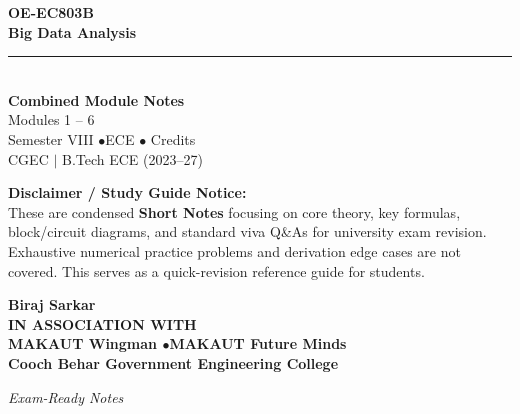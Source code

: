 \documentclass[12pt,a4paper]{article}
\begin{document}
\thispagestyle{empty}


\vspace*{1.0cm}
\begin{center}
  {\Huge\bfseries\color{myred} OE-EC803B}\\[10pt]
  {\LARGE\bfseries\color{mydark} Big Data Analysis}\\[20pt]
  {\color{myred}\rule{0.7\linewidth}{1.5pt}}\\[18pt]
  {\Large\color{myteal}\textbf{Combined Module Notes}}\\[8pt]
  {\large\color{mydark} Modules 1 -- 6}\\[40pt]
  {\normalsize\color{mydark} Semester VIII \quad$\bullet$\quad ECE \quad$\bullet$ Credits}\\[12pt]
  {\normalsize\color{mydark} CGEC \;$|$\; B.Tech ECE (2023--27)}
\end{center}
\vspace{1.0cm}
\begin{center}
  \begin{tcolorbox}[colback=mygray, colframe=mgframe, boxrule=0.5pt, arc=3pt, width=0.85\linewidth]
    \centering\small\color{mydark}
    \textbf{Disclaimer / Study Guide Notice:}\\
    These are condensed \textbf{Short Notes} focusing on core theory, key formulas, block/circuit diagrams, and standard viva Q\&As for university exam revision. Exhaustive numerical practice problems and derivation edge cases are not covered. This serves as a quick-revision reference guide for students.
  \end{tcolorbox}
\end{center}
\vfill
\vspace{0.6cm}
\begin{center}
  {\large\bfseries\color{mypurple} Biraj Sarkar}\\[16pt]
  {\footnotesize\color{watermark}\textbf{IN ASSOCIATION WITH}}\\[8pt]
  {\small\bfseries\color{mydark} MAKAUT Wingman \quad$\bullet$\quad MAKAUT Future Minds}\\[12pt]
  {\large\bfseries\color{myteal} Cooch Behar Government Engineering College}
\end{center}
\vfill
\begin{center}{\small\color{watermark}\textit{Exam-Ready Notes}}\end{center}
\clearpage
\end{document}
